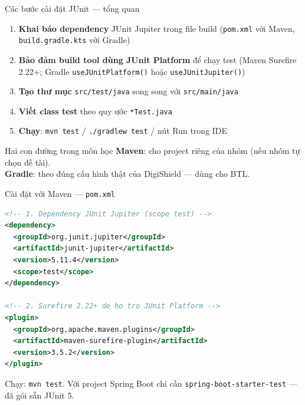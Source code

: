 \documentclass[aspectratio=169,12pt]{beamer}
\begin{document}
\begin{frame}{Các bước cài đặt JUnit --- tổng quan}
  \begin{enumerate}
    \setlength{\itemsep}{0.4em}
    \item \textbf{Khai báo dependency} JUnit Jupiter trong file build
          (\texttt{pom.xml} với Maven, \texttt{build.gradle.kts} với Gradle)
    \item \textbf{Bảo đảm build tool dùng JUnit Platform} để chạy test
          (Maven Surefire 2.22+; Gradle \texttt{useJUnitPlatform()}
          hoặc \texttt{useJUnitJupiter()})
    \item \textbf{Tạo thư mục} \texttt{src/test/java} song song với
          \texttt{src/main/java}
    \item \textbf{Viết class test} theo quy ước \texttt{*Test.java}
    \item \textbf{Chạy}: \texttt{mvn test} / \texttt{./gradlew test} / nút Run trong IDE
  \end{enumerate}

  \vspace{0.4em}
  \begin{exampleblock}{Hai con đường trong môn học}
    \textbf{Maven}: cho project riêng của nhóm (nếu nhóm tự chọn đề tài).\\
    \textbf{Gradle}: theo đúng cấu hình thật của DigiShield --- dùng cho BTL.
  \end{exampleblock}
\end{frame}

\begin{frame}[fragile,shrink=8]{Cài đặt với Maven --- \texttt{pom.xml}}
\begin{lstlisting}[language=xml]
<!-- 1. Dependency JUnit Jupiter (scope test) -->
<dependency>
  <groupId>org.junit.jupiter</groupId>
  <artifactId>junit-jupiter</artifactId>
  <version>5.11.4</version>
  <scope>test</scope>
</dependency>

<!-- 2. Surefire 2.22+ de ho tro JUnit Platform -->
<plugin>
  <groupId>org.apache.maven.plugins</groupId>
  <artifactId>maven-surefire-plugin</artifactId>
  <version>3.5.2</version>
</plugin>
\end{lstlisting}
  \vspace{-0.2em}
  {\small Chạy: \texttt{mvn test}. Với project Spring Boot chỉ cần
  \texttt{spring-boot-starter-test} --- đã gói sẵn JUnit 5.}
\end{frame}
\end{document}

